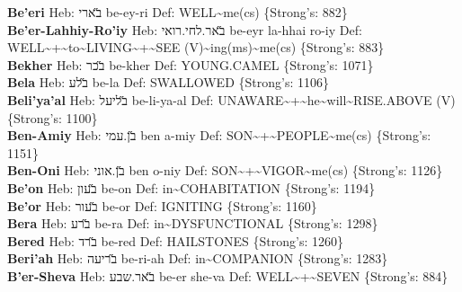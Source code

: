 {\textbf{Be'eri} Heb: {\large\H בארי} be-ey-ri Def: WELL\textasciitilde{}me(cs) \{Strong's: 882\}\hfill{}\\

\textbf{Be'er-Lahhiy-Ro'iy} Heb: {\large\H באר.לחי.רואי} be-eyr la-hhai ro-iy Def: WELL\textasciitilde{}+\textasciitilde{}to\textasciitilde{}LIVING\textasciitilde{}+\textasciitilde{}SEE (V)\textasciitilde{}ing(ms)\textasciitilde{}me(cs) \{Strong's: 883\}\hfill{}\\

\textbf{Bekher} Heb: {\large\H בכר} be-kher Def: YOUNG.CAMEL \{Strong's: 1071\}\hfill{}\\

\textbf{Bela} Heb: {\large\H בלע} be-la Def: SWALLOWED \{Strong's: 1106\}\hfill{}\\

\textbf{Beli'ya'al} Heb: {\large\H בליעל} be-li-ya-al Def: UNAWARE\textasciitilde{}+\textasciitilde{}he\textasciitilde{}will\textasciitilde{}RISE.ABOVE (V) \{Strong's: 1100\}\hfill{}\\

\textbf{Ben-Amiy} Heb: {\large\H בן.עמי} ben a-miy Def: SON\textasciitilde{}+\textasciitilde{}PEOPLE\textasciitilde{}me(cs) \{Strong's: 1151\}\hfill{}\\

\textbf{Ben-Oni} Heb: {\large\H בן.אוני} ben o-niy Def: SON\textasciitilde{}+\textasciitilde{}VIGOR\textasciitilde{}me(cs) \{Strong's: 1126\}\hfill{}\\

\textbf{Be'on} Heb: {\large\H בעון} be-on Def: in\textasciitilde{}COHABITATION \{Strong's: 1194\}\hfill{}\\

\textbf{Be'or} Heb: {\large\H בעור} be-or Def: IGNITING \{Strong's: 1160\}\hfill{}\\

\textbf{Bera} Heb: {\large\H ברע} be-ra Def: in\textasciitilde{}DYSFUNCTIONAL \{Strong's: 1298\}\hfill{}\\

\textbf{Bered} Heb: {\large\H ברד} be-red Def: HAILSTONES \{Strong's: 1260\}\hfill{}\\

\textbf{Beri'ah} Heb: {\large\H בריעה} be-ri-ah Def: in\textasciitilde{}COMPANION \{Strong's: 1283\}\hfill{}\\

\textbf{B'er-Sheva} Heb: {\large\H באר.שבע} be-er she-va Def: WELL\textasciitilde{}+\textasciitilde{}SEVEN \{Strong's: 884\}\hfill{}\\

}
